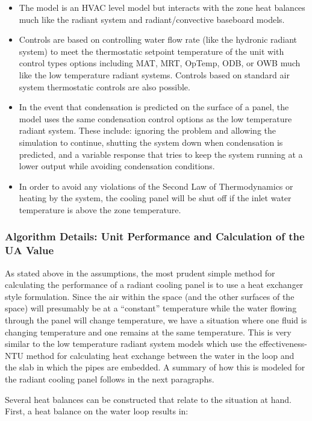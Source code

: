 \begin{itemize}
\item
  The model is an HVAC level model but interacts with the zone heat balances much like the radiant system and radiant/convective baseboard models.
\item
  Controls are based on controlling water flow rate (like the hydronic radiant system) to meet the thermostatic setpoint temperature of the unit with control types options including MAT, MRT, OpTemp, ODB, or OWB much like the low temperature radiant systems.  Controls based on standard air system thermostatic controls are also possible.
\item
  In the event that condensation is predicted on the surface of a panel, the model uses the same condensation control options as the low temperature radiant system.  These include: ignoring the problem and allowing the simulation to continue, shutting the system down when condensation is predicted, and a variable response that tries to keep the system running at a lower output while avoiding condensation conditions.
\item
  In order to avoid any violations of the Second Law of Thermodynamics or heating by the system, the cooling panel will be shut off if the inlet water temperature is above the zone temperature.
\end{itemize}

\subsubsection{Algorithm Details: Unit Performance and Calculation of the UA Value}\label{algorithm-details-unit-performance-and-calculation-of-the-ua-value}

As stated above in the assumptions, the most prudent simple method for calculating the performance of a radiant cooling panel is to use a heat exchanger style formulation.  Since the air within the space (and the other surfaces of the space) will presumably be at a “constant” temperature while the water flowing through the panel will change temperature, we have a situation where one fluid is changing temperature and one remains at the same temperature.  This is very similar to the low temperature radiant system models which use the effectiveness-NTU method for calculating heat exchange between the water in the loop and the slab in which the pipes are embedded.  A summary of how this is modeled for the radiant cooling panel follows in the next paragraphs.

Several heat balances can be constructed that relate to the situation at hand.  First, a heat balance on the water loop results in:

